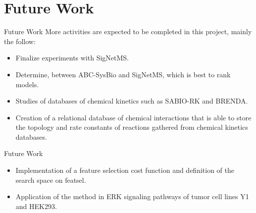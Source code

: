 \documentclass{beamer}
\begin{document}
\section{Future Work}

\begin{frame}{Future Work}
More activities are expected to be completed in this project, mainly the
follow:
\begin{itemize}
    \pause
    \item{} Finalize experiments with SigNetMS.
    \pause
    \item{} Determine, between ABC-SysBio and SigNetMS,
        which is best to rank models.
    \pause
    \item{} Studies of databases of chemical kinetics 
        such as SABIO-RK and BRENDA.
    \pause
    \item{} Creation of a relational database of chemical 
        interactions that is able to store the topology and rate 
        constants of reactions gathered from chemical kinetics 
        databases.
    \end{itemize}
\end{frame}


\begin{frame}{Future Work}
\begin{itemize}
    \item{} Implementation of a feature selection cost
        function and definition of the search space on featsel. 
    \pause
    \item{} Application of the method in ERK signaling 
        pathways of tumor cell lines Y1 and HEK293.
\end{itemize}
\end{frame}
\end{document}
